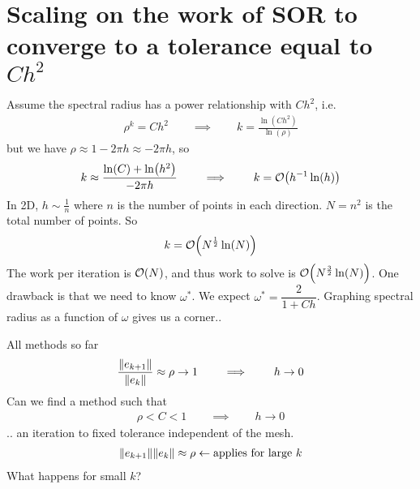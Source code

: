 \documentclass{article}
\newcommand{\qiq}{\qquad \implies \qquad}
\begin{document}
    \section{Scaling on the work of SOR to converge to a tolerance equal to $Ch^2$}
        Assume the spectral radius has a power relationship with $Ch^2$, i.e.
        \begin{align}
            \rho^k = Ch^2 \qiq k = \frac{\ln(Ch^2)}{\ln(\rho)}
        \end{align}
        but we have $\rho \approx 1 - 2\pi h \approx -2\pi h$, so
        \begin{align}
            k \approx \frac{\ln(C) + \ln(h^2)}{-2\pi h} \qiq k = \order{h^{-1}\ln(h)}
        \end{align}
        In 2D, $h\sim \frac{1}{n}$ where $n$ is the number of points in each direction.  $N = n^2$ is the total number of points.  So
        \begin{align}
            k = \order{N^\frac{1}{2}\ln(N)}
        \end{align}
        The work per iteration is $\order{N}$, and thus work to solve is $\order{N^\frac{3}{2}\ln(N)}$.  One drawback is that we need to know $\omega^*$.  We expect $\omega^* = \dfrac{2}{1 + Ch}$.  Graphing spectral radius as a function of $\omega$ gives us a corner..
        \begin{figure}[ht!]
            \centering
        \end{figure}
        \FloatBarrier
        \vspace{-1.5cm}
        All methods so far
        \begin{align}
            \frac{\norm{e_{k+1}}}{\norm{e_k}} \approx \rho \rightarrow 1 \qiq h \rightarrow 0
        \end{align}
        Can we find a method such that
        \begin{align}
            \rho < C < 1 \qiq h \rightarrow 0
        \end{align}
        .. an iteration to fixed tolerance independent of the mesh.
        \begin{align}
            \norm{e_{k+1}}{\norm{e_k}} \approx \rho \leftarrow \text{applies for large $k$}
        \end{align}
        What happens for small $k$?
\end{document}
